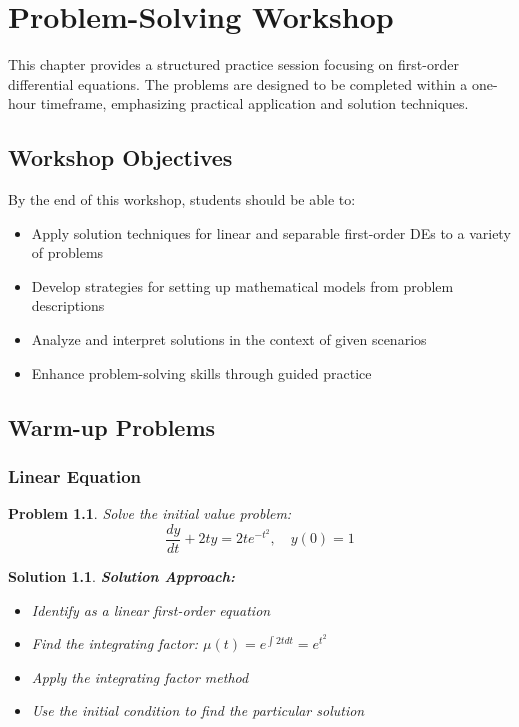 \documentclass[12pt, letterpaper]{book}
\newcounter{problemcounter}[chapter]
\theoremstyle{problemstyle}
\newtheorem{problem}[problemcounter]{Problem}
\theoremstyle{solutionstyle}
\newtheorem*{solution}{Solution}
\begin{document}
\chapter{Problem-Solving Workshop}
\label{chap:session_4}

This chapter provides a structured practice session focusing on first-order differential equations. The problems are designed to be completed within a one-hour timeframe, emphasizing practical application and solution techniques.

\section{Workshop Objectives}
By the end of this workshop, students should be able to:
\begin{itemize}
    \item Apply solution techniques for linear and separable first-order DEs to a variety of problems
    \item Develop strategies for setting up mathematical models from problem descriptions
    \item Analyze and interpret solutions in the context of given scenarios
    \item Enhance problem-solving skills through guided practice
\end{itemize}

\section{Warm-up Problems}

\subsection{Linear Equation}

\begin{problem}
Solve the initial value problem:
$$\frac{dy}{dt} + 2ty = 2te^{-t^2}, \quad y(0) = 1$$
\end{problem}

\begin{solution}
\textbf{Solution Approach:}
\begin{itemize}
    \item Identify as a linear first-order equation
    \item Find the integrating factor: $\mu(t) = e^{\int 2t dt} = e^{t^2}$
    \item Apply the integrating factor method
    \item Use the initial condition to find the particular solution
\end{itemize}
\end{solution}
\end{document}
